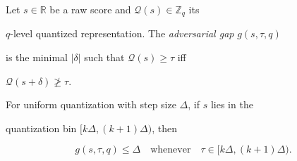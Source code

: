 \begin{definition}






Let $s \in \mathbb{R}$ be a raw score and $\mathcal{Q}(s) \in \mathbb{Z}_q$ its






$q$-level quantized representation.  The \emph{adversarial gap} $g(s, \tau, q)$






is the minimal $| \delta |$ such that $\mathcal{Q}(s) \geq \tau$ iff






$\mathcal{Q}(s + \delta) \ngeq \tau$.






\end{definition}













\begin{property}






For uniform quantization with step size $\Delta$, if $s$ lies in the






quantization bin $[k\Delta, (k+1)\Delta)$, then






\[






g(s, \tau, q) \leq \Delta \quad \text{whenever} \quad \tau \in [k\Delta, (k+1)\Delta).






\]






\end{property}













